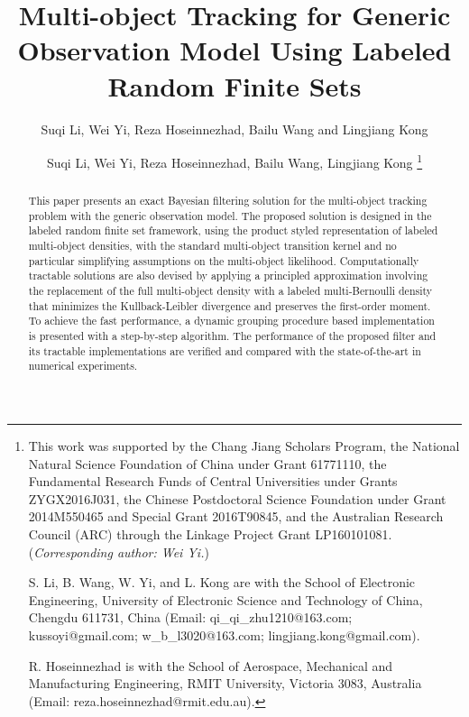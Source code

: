 \documentclass[journal]{IEEEtran}
\begin{document}
\title{Multi-object Tracking  for Generic Observation Model Using Labeled Random Finite Sets}
\author{
Suqi Li, Wei Yi, Reza Hoseinnezhad, Bailu Wang and Lingjiang Kong\\
}

\author{
Suqi Li, Wei Yi, Reza Hoseinnezhad, Bailu Wang, Lingjiang Kong
\thanks{This work was supported
by the Chang Jiang Scholars Program, the National Natural Science Foundation of China under Grant 61771110, the Fundamental Research Funds of Central Universities under Grants ZYGX2016J031, the Chinese Postdoctoral Science Foundation under Grant 2014M550465 and Special Grant 2016T90845,  and the Australian Research Council (ARC) through the Linkage Project Grant LP160101081. (\textit{Corresponding author: Wei Yi.})


S. Li, B. Wang, W. Yi,  and L. Kong  are with the School of  Electronic Engineering, University of Electronic Science and Technology of China, Chengdu 611731, China (Email: qi\_qi\_zhu1210@163.com;  kussoyi@gmail.com; w\_b\_l3020@163.com; lingjiang.kong@gmail.com).

R. Hoseinnezhad is with the School of Aerospace, Mechanical and Manufacturing Engineering, RMIT University, Victoria 3083, Australia (Email: reza.hoseinnezhad@rmit.edu.au). 



}
}


\maketitle

\begin{abstract}
This paper presents  an exact Bayesian filtering solution for the multi-object tracking problem with the generic observation model. The proposed solution is designed in the labeled random finite set framework, using the product styled representation of labeled multi-object densities, with the standard multi-object transition kernel and no particular simplifying assumptions on the multi-object likelihood. 
Computationally tractable solutions are also devised by applying a principled approximation involving the replacement of the full multi-object density with a labeled multi-Bernoulli density that minimizes the Kullback-Leibler divergence and preserves the first-order moment. To achieve the fast performance, a dynamic grouping procedure based implementation is presented with a step-by-step algorithm. The performance of the proposed filter and its tractable implementations are verified and compared with the state-of-the-art in numerical experiments.
\end{abstract}
\IEEEpeerreviewmaketitle
\end{document}
